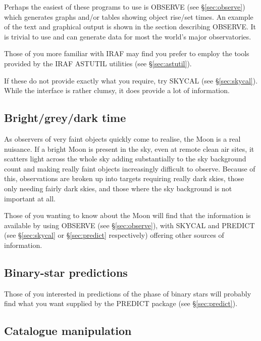 \documentclass[twoside,11pt]{article}
\newcommand{\xref}[3]{#1}
\newcommand{\xlabel}[1]{}
\newcommand{\OBSERVEref}{\xref{OBSERVE}{sun146}{}}
\begin{document}
Perhaps the easiest of these programs to use is {\OBSERVEref} 
(see \S{\ref{sec:observe}}) which generates graphs and/or tables showing object
rise/set times. An example of the text and graphical output is shown in 
the section describing OBSERVE. It is trivial to use and 
can generate data for most the world's major observatories.

Those of you more familiar with IRAF may find you prefer to employ the 
tools provided by the IRAF ASTUTIL utilities (see \S{\ref{sec:astutil}}).

If these do not provide exactly what you require, try SKYCAL (see \S{\ref{sec:skycal}}). While the
interface is rather clumsy, it does provide a lot of information.

\subsection{Bright/grey/dark time} \xlabel{BRIGHT}
\label{sec:bright}

As observers of very faint objects quickly come to realise, 
the Moon is a real nuisance. If a bright Moon is present in the sky,
even at remote clean air sites, it scatters light across the whole sky
adding substantially to the sky background count and making really
faint objects increasingly difficult to observe. Because of this,
observations are broken up into targets requiring really dark skies,
those only needing fairly dark skies, and those where the 
sky background is not important at all. 

Those of you wanting to know about the Moon will find that the information is 
available by using {\OBSERVEref} (see \S{\ref{sec:observe}}), with SKYCAL and 
PREDICT (see \S{\ref{sec:skycal}} or \S{\ref{sec:predict}} respectively) offering
other sources of information.

\subsection{Binary-star predictions} \xlabel{BINARY}
\label{sec:binary}

Those of you interested in predictions of the phase of binary stars 
will probably find what you want supplied by  the PREDICT package (see \S{\ref{sec:predict}}).

\subsection{Catalogue manipulation} \xlabel{CATALOGUEM}
\label{sec:cataloguem}
\end{document}
